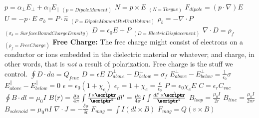 \documentclass[1pt]{report}
\begin{document}
\begin{multicols}{3}
\begin{flushleft}
$p=\alpha_\perp E_\perp +\alpha_\parallel E_\parallel$ $_{(p=Dipole Moment)}$
\linebreak
$N=p \times E$ $_{(N=Torgue)}$
\linebreak
$F_{dipole}=(p\cdot\nabla)E$
\linebreak
$U=-p\cdot E$
\linebreak
$\sigma_b=P\cdot\hat{n}$ $_{(P=Dipole Moment Per Unit Volume)}$
\linebreak
$\rho_b=-\nabla\cdot P$ $_{(\sigma_b=Surface Bound Charge Density)}$
\linebreak
$D=\epsilon_0E+P$ $_{(D=Electric Displacement)}$
\linebreak
$\nabla\cdot D=\rho_f$ $_{(\rho_f=Free Charge)}$
\linebreak
\textbf{Free Charge:} The free charge might consist of electrons on a conductor or ions embedded in the dielectric material or whatever; and charge, in other words, that is \textit{not} a result of polarization. Free charge is the stuff we control.
\linebreak
$\oint D\cdot da=Q_{fenc}$
\linebreak
$D=\epsilon E$
\linebreak
$D^{\perp}_{above}-D^{\perp}_{below}=\sigma_f$
\linebreak
$E^{\perp}_{above}-E^{\perp}_{below}=\frac{1}{\epsilon_0}\sigma$
\linebreak
$E^{\parallel}_{above}-E^{\parallel}_{below}=0$
\linebreak
$\epsilon=\epsilon_0(1+\chi_e)$
\linebreak
$\epsilon_r=1+\chi_e=\frac{\epsilon}{\epsilon_0}$
\linebreak
$P=\epsilon_0\chi_eE$
\linebreak
$C=\epsilon_rC_{vac}$
\linebreak
$\oint B\cdot dl=\mu_0I$
\linebreak
$B(r)=\frac{\mu_0}{4\pi}\int\frac{I\times\hat{\pmb{\scriptr}}}{\pmb{\scriptr}^2}dl'=\frac{\mu_0}{4\pi}I\int\frac{dl'\times\hat{\pmb{\scriptr}}}{\pmb{\scriptr}^2}$
\linebreak
$B_{loop}=\frac{\mu_0 I}{2r}$
\linebreak
$B_{line}=\frac{\mu_0 I}{2\pi r}$
\linebreak
$B_{solenoid}=\mu_0nI$
\linebreak
$\nabla\cdot J=-\frac{\delta \rho}{\delta t}$
\linebreak
$F_{mag}=\int I(dl\times B)$
\linebreak
$F_{mag}=Q(v\times B)$

\end{flushleft}
\end{multicols}
\end{document}
